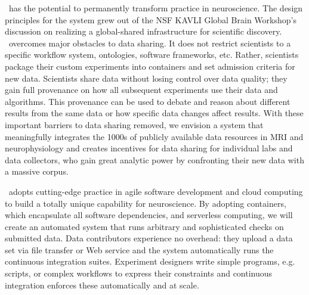%
\name~has the potential to permanently transform practice in neuroscience. The design principles for the system grew out of the NSF KAVLI Global Brain Workshop's discussion on realizing a global-shared infrastructure for scientific discovery. \name~overcomes major obstacles to data sharing. It does not restrict scientists to a specific workflow system, ontologies, software frameworks, etc. Rather, scientists package their custom experiments into containers and set admission criteria for new data. Scientists share data without losing control over data quality; they gain full provenance on how all subsequent experiments use their data and algorithms. This provenance can be used to debate and reason about different results from the same data or how specific data changes affect results. With these important barriers to data sharing removed, we envision a system that meaningfully integrates the 1000s of publicly available data resources in MRI and neurophysiology and creates incentives for data sharing for individual labs and data collectors, who gain great analytic power by confronting their new data with a massive corpus.

%
\name~adopts cutting-edge practice in agile software development and cloud computing to build a totally unique capability for neuroscience. By adopting containers, which encapsulate all software dependencies, and serverless computing, we will create an automated system that runs arbitrary and sophisticated checks on submitted data. Data contributors experience no overhead: they upload a data set via file transfer or Web service and the system automatically runs the continuous integration suites. Experiment designers write simple programs, e.g. scripts, or complex workflows to express their constraints and continuous integration enforces these automatically and at scale.

\vspace{-3pt}

